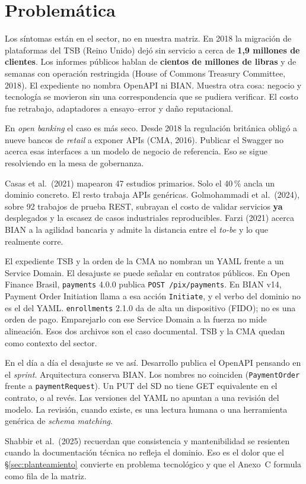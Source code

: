 \section{Problemática}
\label{sec:problematica}

Los síntomas están en el sector, no en nuestra matriz. En 2018 la migración de plataformas del TSB
(Reino Unido) dejó sin servicio a cerca de \textbf{1,9 millones de clientes}. Los informes públicos
hablan de \textbf{cientos de millones de libras} y de semanas con operación restringida
(House of Commons Treasury Committee, 2018). El expediente no nombra OpenAPI ni BIAN. Muestra otra
cosa: negocio y tecnología se movieron sin una correspondencia que se pudiera verificar. El costo
fue retrabajo, adaptadores a ensayo--error y daño reputacional.

En \textit{open banking} el caso es más seco. Desde 2018 la regulación británica obligó a nueve
bancos de \textit{retail} a exponer APIs (CMA, 2016). Publicar el Swagger no acerca esas interfaces
a un modelo de negocio de referencia. Eso se sigue resolviendo en la mesa de gobernanza.

Casas et al.\ (2021) mapearon 47 estudios primarios. Solo el 40\,\% ancla un dominio concreto. El
resto trabaja APIs genéricas. Golmohammadi et al.\ (2024), sobre 92 trabajos de prueba REST,
subrayan el costo de validar servicios \textbf{ya} desplegados y la escasez de casos industriales
reproducibles. Farzi (2021) acerca BIAN a la agilidad bancaria y admite la distancia entre el
\textit{to-be} y lo que realmente corre.

El expediente TSB y la orden de la CMA no nombran un YAML frente a un Service Domain. El
desajuste se puede señalar en contratos públicos. En Open Finance Brasil, \texttt{payments}
4.0.0 publica \texttt{POST /pix/payments}. En BIAN v14, Payment Order Initiation llama a esa
acción \texttt{Initiate}, y el verbo del dominio no es el del YAML. \texttt{enrollments} 2.1.0
da de alta un dispositivo (FIDO); no es una orden de pago. Emparejarlo con ese Service Domain
a la fuerza no mide alineación. Esos dos archivos son el caso documental. TSB y la CMA quedan
como contexto del sector.

En el día a día el desajuste se ve así. Desarrollo publica el OpenAPI pensando en el \textit{sprint}.
Arquitectura conserva BIAN. Los nombres no coinciden (\texttt{PaymentOrder} frente a
\texttt{paymentRequest}). Un PUT del SD no tiene GET equivalente en el contrato, o al revés. Las
versiones del YAML no apuntan a una revisión del modelo. La revisión, cuando existe, es una
lectura humana o una herramienta genérica de \textit{schema matching}.

Shabbir et al.\ (2025) recuerdan que consistencia y mantenibilidad se resienten cuando la
documentación técnica no refleja el dominio. Eso es el dolor que el §\ref{sec:planteamiento}
convierte en problema tecnológico y que el Anexo~C formula como fila de la matriz.
